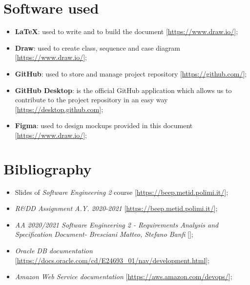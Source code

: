 \section{Software used}

\begin{itemize}
\item \textbf{\LaTeX}: used to write and to build the document [\url{https://www.draw.io/}];
\item\textbf{Draw}: used to create class, sequence and case diagram [\url{https://www.draw.io/}];
\item\textbf{GitHub}: used to store and manage project repository [\url{https://github.com/}];
\item\textbf{GitHub Desktop}: is the official GitHub application which allows us to contribute to the project repository in an easy way [\url{https://desktop.github.com}];
\item\textbf{Figma}: used to design mockups provided in this document [\url{https://www.draw.io/}];
\begin{comment}
\item\textbf{}:;
\item\textbf{}:;
\item\textbf{}:;
\end{comment}
\end{itemize}



\section{Bibliography}
\begin{itemize}
\item Slides of \textit{Software Engineering 2} course [\url{https://beep.metid.polimi.it/}];
\item \textit{R\&DD Assignment A.Y. 2020-2021} 
[\url{https://beep.metid.polimi.it/}];
\item \textit{AA 2020/2021 Software Engineering 2 - \textit{Requirements Analysis and Specification Document}- Bresciani Matteo, Stefano Banfi} 
[\url{}]; 
\item \textit{Oracle DB documentation} 
[\url{https://docs.oracle.com/cd/E24693_01/nav/development.html}]; 
\item \textit{Amazon Web Service documentation} [\url{https://aws.amazon.com/devops/}];
\end{itemize}

